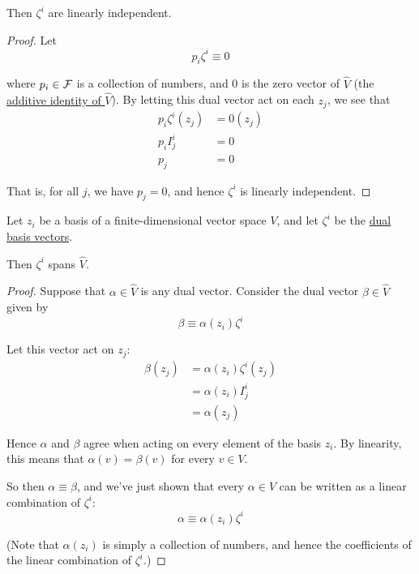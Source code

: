 Then $\zeta^i$ are linearly independent.

\begin{proof}
  Let
  $$
    p_i\zeta^i\equiv 0
  $$

  where $p_i\in\mathcal F$ is a collection of numbers, and 0 is the zero vector of
  $\hat V$ (the \href{dc79809}{additive identity of $\hat V$}). By letting this
  dual vector act on each $z_j$, we see that
  \begin{align*}
    p_i\zeta^i(z_j) &= 0(z_j) \\
    p_iI^i_j        &= 0      \\
    p_j             &= 0
  \end{align*}

  That is, for all $j$, we have $p_j=0$, and hence $\zeta^i$ is linearly
  independent.
\end{proof}

\label{a6b219f}

\cvn Let $z_i$ be a basis of a finite-dimensional vector space $V$, and let
$\zeta^i$ be the \href{b5a6327}{dual basis vectors}.

Then $\zeta^i$ spans \href{cb9eede}{$\hat V$}.

\begin{proof}
  Suppose that $\alpha\in\hat V$ is any dual vector. Consider the dual vector
  $\beta\in\hat V$ given by
  $$
    \beta\equiv\alpha(z_i)\zeta^i
  $$

  Let this vector act on $z_j$:
  \begin{align*}
    \beta(z_j) &=\alpha(z_i)\zeta^i(z_j) \\
               &=\alpha(z_i)I^i_j        \\
               &=\alpha(z_j)
  \end{align*}

  Hence $\alpha$ and $\beta$ agree when acting on every element of the basis
  $z_i$. By linearity, this means that $\alpha(v)=\beta(v)$ for every $v\in V$.

  So then $\alpha\equiv\beta$, and we've just shown that every $\alpha\in\hat
  V$ can be written as a linear combination of $\zeta^i$:
  $$
    \alpha\equiv\alpha(z_i)\zeta^i
  $$

  (Note that $\alpha(z_i)$ is simply a collection of numbers, and hence the
  coefficients of the linear combination of $\zeta^i$.)
\end{proof}

\label{b527a74}

